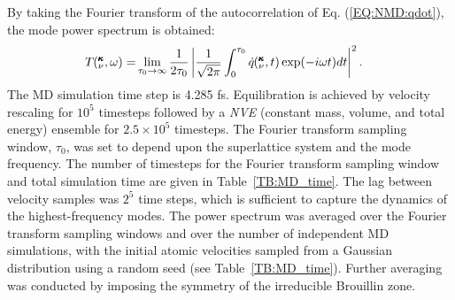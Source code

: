\documentclass[aps,prb,preprint,preprintnumbers,amsmath,amssymb,floatfix,superscriptaddress]{revtex4}
\newcommand{\kvt}{\mspace{-4.0mu}\left(\mspace{-8.0mu}
\begin{smallmatrix}&\pmb{\kappa} \\&\nu\end{smallmatrix}
\mspace{-2.0mu},t\right)}
\newcommand{\kvw}{\mspace{-4.0mu}\left(\mspace{-8.0mu}
\begin{smallmatrix}&\pmb{\kappa} \\&\nu\end{smallmatrix}
\mspace{-2.0mu},\omega\right)}
\begin{document}
By taking the Fourier transform of the autocorrelation of Eq. (\ref{EQ:NMD:qdot}), the mode power spectrum is obtained: \cite{dove_introduction_1993-3}
\begin{equation}\label{EQ:NMD:SED}
\begin{split}
T\kvw=&\lim_{\tau_0\rightarrow\infty}\frac{1}{2\tau_0}\left|\frac{1}{\sqrt{2\pi}}\int_{0}^{\tau_0}\dot{q}\kvt\exp(-i\omega t)dt\right|^2.
\end{split}
\end{equation}
The MD simulation time step is 4.285 fs. Equilibration is achieved by velocity rescaling for $10^5$ timesteps followed by a \textit{NVE} (constant mass, volume, and total energy) ensemble for $2.5 \times10^5$ timesteps. The Fourier transform sampling window, $\tau_0$, was set to depend upon the superlattice system and the mode frequency. The number of timesteps for the Fourier transform sampling window and total simulation time are given in Table~\ref{TB:MD_time}. The lag between velocity samples was $2^5$ time steps, which is sufficient to capture the dynamics of the highest-frequency modes. The power spectrum was averaged over the Fourier transform sampling windows and over the number of independent MD simulations, with the initial atomic velocities sampled from a Gaussian distribution using a random seed (see Table~\ref{TB:MD_time}). Further averaging was conducted by imposing the symmetry of the irreducible Brouillin zone. 
\end{document}

